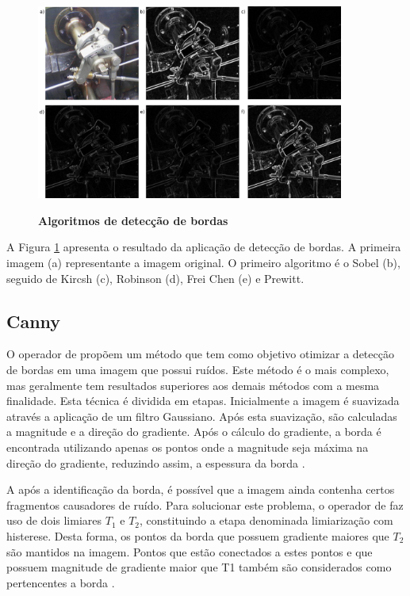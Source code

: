 \documentclass[
	12pt,				%
	oneside,			%
	a4paper,			%
	english,			%
	french,				%
	spanish,			%
	brazil,				%
	]{abntex2}
\begin{document}
\begin{figure}[ht]
\centering
\caption{\textbf{Algoritmos de detecção de bordas}}
\includegraphics[width=0.9\textwidth]{imagens/deteccao_bordas.png}
\sourceAuthor
\label{fig:deteccao_bordas}
\end{figure}

A Figura \ref{fig:deteccao_bordas} apresenta o resultado da aplicação de detecção de bordas. A primeira imagem (a) representante a imagem original. O primeiro algoritmo é o Sobel (b), seguido de Kircsh (c), Robinson (d), Frei Chen (e) e Prewitt.

\subsection{Canny}

O operador de \citet{canny:1986} propõem um método que tem como objetivo otimizar a detecção de bordas em uma imagem que possui ruídos. Este método é o mais complexo, mas geralmente tem resultados superiores aos demais métodos com a mesma finalidade. Esta técnica é dividida em etapas. Inicialmente a imagem é suavizada através a aplicação de um filtro Gaussiano. Após esta suavização, são calculadas a magnitude e a direção do gradiente. Após o cálculo do gradiente, a borda é encontrada utilizando apenas os pontos onde a magnitude seja máxima na direção do gradiente, reduzindo assim, a espessura da borda \cite{pedriniSchwartz:2008}.

A após a identificação da borda, é possível que a imagem ainda contenha certos fragmentos causadores de ruído. Para solucionar este problema, o operador de \citet{canny:1986} faz uso de dois limiares \(T_1\) e \(T_2\), constituindo a etapa denominada limiarização com histerese. Desta forma, os pontos da borda que possuem gradiente maiores que \(T_2\) são mantidos na imagem. Pontos que estão conectados a estes pontos e que possuem magnitude de gradiente maior que T1 também são considerados como pertencentes a borda \cite{pedriniSchwartz:2008}.
\end{document}
